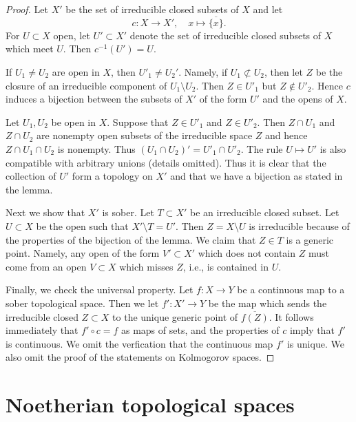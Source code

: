 \begin{proof}
Let $X'$ be the set of irreducible closed subsets of $X$ and let
$$
c : X \to X', \quad x \mapsto \overline{\{x\}}.
$$
For $U \subset X$ open, let $U' \subset X'$ denote the set
of irreducible closed subsets of $X$ which meet $U$.
Then $c^{-1}(U') = U$.

\medskip\noindent
If $U_1 \not = U_2$ are open in $X$, then $U'_1 \not = U_2'$.
Namely, if $U_1 \not \subset U_2$, then
let $Z$ be the closure of an irreducible component of
$U_1 \setminus U_2$.
Then $Z \in U'_1$ but $Z \not \in U'_2$. Hence $c$ induces
a bijection between the subsets of $X'$ of the form $U'$ and the
opens of $X$.

\medskip\noindent
Let $U_1, U_2$ be open in $X$. Suppose that $Z \in U'_1$ and
$Z \in U'_2$. Then $Z \cap U_1$ and $Z \cap U_2$ are nonempty
open subsets of the irreducible space $Z$ and hence $Z \cap U_1 \cap U_2$
is nonempty. Thus $(U_1 \cap U_2)' = U'_1 \cap U'_2$.
The rule $U \mapsto U'$ is also compatible with arbitrary unions
(details omitted). Thus it is clear that the collection of
$U'$ form a topology on $X'$ and that we have a bijection as
stated in the lemma.

\medskip\noindent
Next we show that $X'$ is sober. Let $T \subset X'$ be an irreducible
closed subset. Let $U \subset X$ be the open such that $X' \setminus T = U'$.
Then $Z = X \setminus U$ is irreducible because of the properties
of the bijection of the lemma. We claim that $Z \in T$ is a generic
point. Namely, any open of the form $V' \subset X'$
which does not contain $Z$ must come from an open $V \subset X$
which misses $Z$, i.e., is contained in $U$.

\medskip\noindent
Finally, we check the universal property. Let $f : X \to Y$ be a continuous
map to a sober topological space. Then we let $f' : X' \to Y$ be the map
which sends the irreducible closed $Z \subset X$ to the unique generic
point of $\overline{f(Z)}$. It follows immediately that
$f' \circ c = f$ as maps of sets, and the properties of $c$ imply that
$f'$ is continuous. We omit the verfication that the continuous
map $f'$ is unique. We also omit the proof of the statements on
Kolmogorov spaces.
\end{proof}



\section{Noetherian topological spaces}
\label{section-noetherian}

